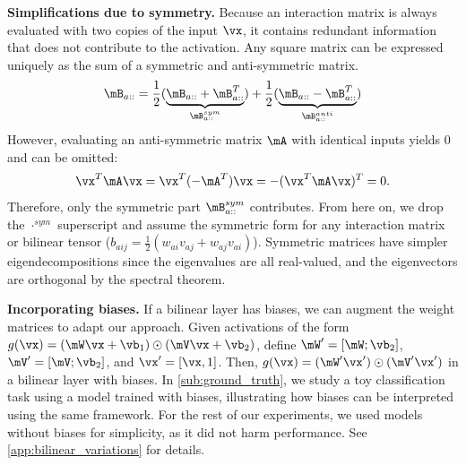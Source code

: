\documentclass{article} %
\begin{document}
\textbf{Simplifications due to symmetry.} Because an interaction matrix is always evaluated with two copies of the input $\vx$, it contains redundant information that does not contribute to the activation. Any square matrix can be expressed uniquely as the sum of a symmetric and anti-symmetric matrix.
\begin{align*}
\mB_{a::} = \dfrac{1}{2} ( \underbrace{\mB_{a::} + \mB_{a::}^T}_{\mB_{a::}^{sym}} ) + \dfrac{1}{2} ( \underbrace{\mB_{a::} - \mB_{a::}^T}_{\mB_{a::}^{anti}} )
\end{align*}
However, evaluating an anti-symmetric matrix $\mA$ with identical inputs yields 0 and can be omitted:
\begin{align*}
\vx^T \mA \vx = \vx^T (-\mA^T) \vx = - (\vx^T \mA \vx)^T = 0.
\end{align*}
Therefore, only the symmetric part $\mB_{a::}^{sym}$ contributes. From here on, we drop the $\cdot^{sym}$ superscript and assume the symmetric form for any interaction matrix or bilinear tensor ($b_{aij} = \frac{1}{2}(w_{ai}v_{aj} + w_{aj}v_{ai})$). Symmetric matrices have simpler eigendecompositions since the eigenvalues are all real-valued, and the eigenvectors are orthogonal by the spectral theorem. 

\textbf{Incorporating biases.} If a bilinear layer has biases, we can augment the weight matrices to adapt our approach.
Given activations of the form $g(\vx)=(\mW\vx+\vb_1) \odot (\mV\vx+\vb_2)$, define $\mW'=[\mW ; \vb_2]$, $\mV'=[\mV ; \vb_2]$, and $\vx'=[\vx, 1]$. Then, $g(\vx)=(\mW' \vx') \odot (\mV' \vx')$ in a bilinear layer with biases.
In \autoref{sub:ground_truth}, we study a toy classification task using a model trained with biases, illustrating how biases can be interpreted using the same framework.
For the rest of our experiments, we used models without biases for simplicity, as it did not harm performance. See \autoref{app:bilinear_variations} for details.
\end{document}
